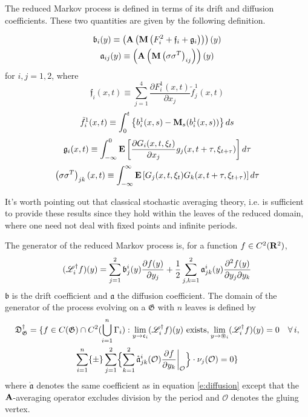 The reduced Markov process is defined in terms of its drift and diffusion coefficients. These two quantities are given by the following definition.
\begin{definition}
\begin{gather}
\mathfrak{b}_i(y) \equiv \left(\operatorname{\mathbf A} \left(\operatorname{\mathbf M} \left(F_i^2 + \mathfrak{f}_i + \mathfrak{g}_i\right)\right)\right)(y)\label{e:drift}\\
\mathfrak a_{ij}(y) \equiv \left(\operatorname{\mathbf A} \left(\operatorname{\mathbf M} \left(\sigma\sigma^T\right)_{ij}\right)\right)(y)\label{e:diffusion}
\end{gather}
for $i,j = 1,2$, where
\[
\mathfrak f_i(x,t) \equiv \sum_{j=1}^4 \frac{\partial F_i^1(x,t)}{\partial x_j} \tilde f_j^1(x,t)
\]
\[
\tilde f_i^1 (x,t) \equiv \int_0^t \left\{b_i^1 (x,s) - \operatorname{\mathbf M}_s (b_i^1(x,s)) \right\} ds\\
\]
\[
\mathfrak g_i(x,t) \equiv \int_{-\infty}^0 \operatorname{\mathbf E} \left[ \frac{\partial G_i (x,t,\xi_t)}{\partial x_j} g_j(x,t+\tau,\xi_{t+\tau}) \right] d\tau
\]
\[
\left(\sigma\sigma^T\right)_{jk}(x,t) \equiv \int_{-\infty}^\infty
\operatorname{\mathbf E} \left[G_j(x,t,\xi_t) G_k (x, t + \tau, \xi_{t+\tau}) \right] d\tau
\]
\end{definition}
It's worth pointing out that classical stochastic averaging theory, i.e. \citet{khasminskii68:_ito} is sufficient to provide these results since they hold within the leaves of the reduced domain, where one need not deal with fixed points and infinite periods.

\begin{definition}
\label{d:reduced generator}
The generator of the reduced Markov process is, for a function $f \in
C^2(\mathbf R^2)$,
\[
(\mathscr L_i^\dagger f)(y) = \sum_{j=1}^2
\mathfrak{b}^i_j(y) \frac{\partial f(y)}{\partial y_j} +
\frac12 \sum_{j,k = 1}^2 \mathfrak{a}^i_{jk}(y)
\frac{\partial^2 f(y)}{\partial y_j \partial y_k}
\]
$\mathfrak{b}$ is the drift coefficient and $\mathfrak{a}$ the diffusion coefficient. The domain of the generator of the process evolving on a $\mathfrak{G}$ with $n$ leaves is defined by
\begin{multline}
\mathfrak{D}_\mathfrak{G}^\dagger = \{f \in C(\mathfrak{G}) \cap
C^2(\bigcup_{i=1}^n \Gamma_i): \lim_{y \to \mathfrak c_i} (\mathscr L^\dagger_i f)(y) \text{ exists}, \lim_{y \to \circledast_i} (\mathscr L^\dagger_i f)(y) = 0 \quad \forall\, i,\\
\sum_{i=1}^n \{\pm\} \sum_{j=1}^2 \Bigl\{\sum_{k=1}^2
\mathring{\mathfrak a}^i_{jk}(\mathcal{O}) \frac{\partial f}{\partial
y_k}\bigg|_\mathcal{O} \Bigr\} \cdot \nu_j(\mathcal O) =0 \}
\label{e:generator domain}
\end{multline}
where $\mathring{\mathfrak{a}}$ denotes the same coefficient as in equation \eqref{e:diffusion} except that the $\operatorname{\mathbf A}$-averaging operator excludes division by the period and $\mathcal O$ denotes the gluing vertex.
\end{definition}

